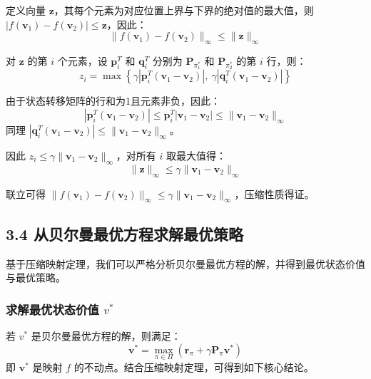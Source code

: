 \documentclass[UTF8]{article}
\begin{document}
\begin{proofbox}
    定义向量 $\boldsymbol{z}$，其每个元素为对应位置上界与下界的绝对值的最大值，则 $|f(\boldsymbol{v}_1) - f(\boldsymbol{v}_2)| \leq \boldsymbol{z}$，因此：
    \[
    \| f(\boldsymbol{v}_1) - f(\boldsymbol{v}_2) \|_\infty \leq \| \boldsymbol{z} \|_\infty
    \]

    对 $\boldsymbol{z}$ 的第 $i$ 个元素，设 $\boldsymbol{p}_i^T$ 和 $\boldsymbol{q}_i^T$ 分别为 $\boldsymbol{P}_{\pi_1^*}$ 和 $\boldsymbol{P}_{\pi_2^*}$ 的第 $i$ 行，则：
    \[
    z_i = \max\left\{ \gamma |\boldsymbol{p}_i^T (\boldsymbol{v}_1 - \boldsymbol{v}_2)|,\ \gamma |\boldsymbol{q}_i^T (\boldsymbol{v}_1 - \boldsymbol{v}_2)| \right\}
    \]

    由于状态转移矩阵的行和为1且元素非负，因此：
    \[
    |\boldsymbol{p}_i^T (\boldsymbol{v}_1 - \boldsymbol{v}_2)| \leq \boldsymbol{p}_i^T |\boldsymbol{v}_1 - \boldsymbol{v}_2| \leq \| \boldsymbol{v}_1 - \boldsymbol{v}_2 \|_\infty
    \]
    同理 $|\boldsymbol{q}_i^T (\boldsymbol{v}_1 - \boldsymbol{v}_2)| \leq \| \boldsymbol{v}_1 - \boldsymbol{v}_2 \|_\infty$。

    因此 $z_i \leq \gamma \| \boldsymbol{v}_1 - \boldsymbol{v}_2 \|_\infty$，对所有 $i$ 取最大值得：
    \[
    \| \boldsymbol{z} \|_\infty \leq \gamma \| \boldsymbol{v}_1 - \boldsymbol{v}_2 \|_\infty
    \]

    联立可得 $\| f(\boldsymbol{v}_1) - f(\boldsymbol{v}_2) \|_\infty \leq \gamma \| \boldsymbol{v}_1 - \boldsymbol{v}_2 \|_\infty$，压缩性质得证。
\end{proofbox}

\subsection*{3.4 从贝尔曼最优方程求解最优策略}

基于压缩映射定理，我们可以严格分析贝尔曼最优方程的解，并得到最优状态价值与最优策略。

\subsubsection*{求解最优状态价值 $v^*$}

若 $v^*$ 是贝尔曼最优方程的解，则满足：
\[
\boldsymbol{v}^* = \max_{\pi \in \Pi} \left( \boldsymbol{r}_\pi + \gamma \boldsymbol{P}_\pi \boldsymbol{v}^* \right)
\]
即 $\boldsymbol{v}^*$ 是映射 $f$ 的不动点。结合压缩映射定理，可得到如下核心结论。
\end{document}
